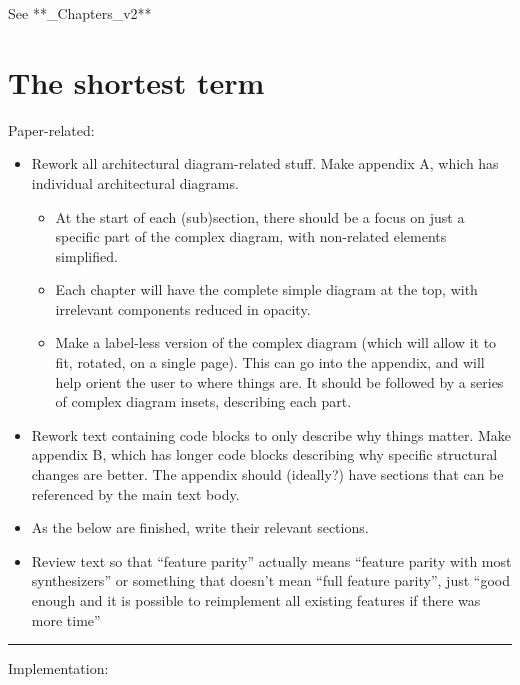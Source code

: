 See **\_Chapters\_v2**

\section{The shortest term}\label{the-shortest-term}

Paper-related:

\begin{itemize}
\tightlist
\item
  Rework all architectural diagram-related stuff. Make appendix A, which
  has individual architectural diagrams.

  \begin{itemize}
  \tightlist
  \item
    At the start of each (sub)section, there should be a focus on just a
    specific part of the complex diagram, with non-related elements
    simplified.
  \item
    Each chapter will have the complete simple diagram at the top, with
    irrelevant components reduced in opacity.
  \item
    Make a label-less version of the complex diagram (which will allow
    it to fit, rotated, on a single page). This can go into the
    appendix, and will help orient the user to where things are. It
    should be followed by a series of complex diagram insets, describing
    each part.
  \end{itemize}
\item
  Rework text containing code blocks to only describe why things matter.
  Make appendix B, which has longer code blocks describing why specific
  structural changes are better. The appendix should (ideally?) have
  sections that can be referenced by the main text body.
\item
  As the below are finished, write their relevant sections.
\item
  Review text so that ``feature parity'' actually means ``feature parity
  with most synthesizers'' or something that doesn't mean ``full feature
  parity'', just ``good enough and it is possible to reimplement all
  existing features if there was more time''
\end{itemize}

\begin{center}\rule{0.5\linewidth}{0.5pt}\end{center}

Implementation:

